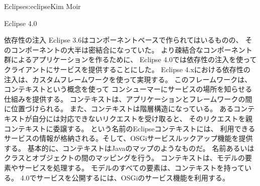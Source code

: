 \begin{aosachapter}{Eclipse}{s:eclipse}{Kim Moir}
\begin{aosasect1}{Eclipse 4.0}
\begin{aosasect2}{依存性の注入}
Eclipse 3.6はコンポーネントベースで作られてはいるものの、
そのコンポーネントの大半は密結合になっていた。
より疎結合なコンポーネント群によるアプリケーションを作るために、
Eclipse 4.0では依存性の注入を使ってクライアントにサービスを提供することにした。
Eclipse 4.xにおける依存性の注入は、カスタムフレームワークを使って実現する。
このフレームワークは、コンテキストという概念を使って
コンシューマーにサービスの場所を知らせる仕組みを提供する。
コンテキストは、アプリケーションとフレームワークの間に位置づけられる。
また、コンテキストは階層構造になっている。
あるコンテキストが自分には対応できないリクエストを受け取ると、
そのリクエストを親コンテキストに委譲する。
という名前のEclipseコンテキストには、
利用できるサービスの情報が格納される。そして、OSGiサービスルックアップ機能を提供する。
基本的に、コンテキストはJavaのマップのようなものだ。
名前あるいはクラスとオブジェクトの間のマッピングを行う。
コンテキストは、モデルの要素やサービスを処理する。
モデルのすべての要素は、コンテキストを持っている。
4.0でサービスを公開するには、OSGiのサービス機能を利用する。



\end{aosasect2}
\end{aosasect1}
\end{aosachapter}
